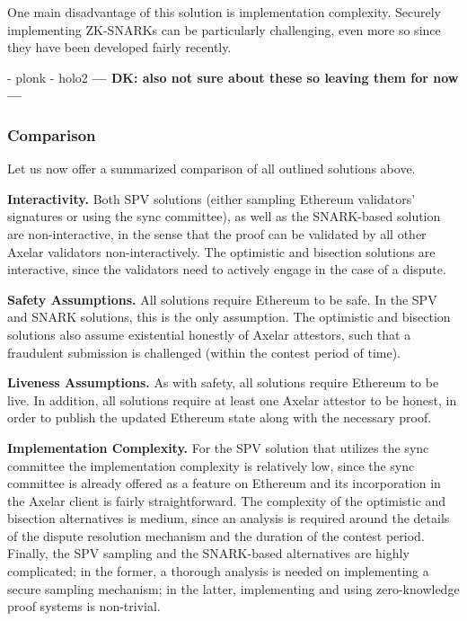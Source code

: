 One main disadvantage of this solution is implementation complexity. Securely
implementing ZK-SNARKs can be particularly challenging, even more so since they
have been developed fairly recently.

- plonk
- holo2
\textbf{--- DK: also not sure about these so leaving them for now ---}

\subsubsection{Comparison}

Let us now offer a summarized comparison of all outlined solutions above.

\noindent\textbf{Interactivity.}
Both SPV solutions (either sampling Ethereum validators' signatures or using
the sync committee), as well as the SNARK-based solution are non-interactive,
in the sense that the proof can be validated by all other Axelar validators
non-interactively. The optimistic and bisection solutions are interactive,
since the validators need to actively engage in the case of a dispute.

\noindent\textbf{Safety Assumptions.}
All solutions require Ethereum to be safe. In the SPV and SNARK solutions, this
is the only assumption. The optimistic and bisection solutions also assume
existential honestly of Axelar attestors, such that a fraudulent submission is
challenged (within the contest period of time).

\noindent\textbf{Liveness Assumptions.}
As with safety, all solutions require Ethereum to be live. In addition, all
solutions require at least one Axelar attestor to be honest, in order to
publish the updated Ethereum state along with the necessary proof.

\noindent\textbf{Implementation Complexity.}
For the SPV solution that utilizes the sync committee the implementation
complexity is relatively low, since the sync committee is already offered as a
feature on Ethereum and its incorporation in the Axelar client is fairly
straightforward. The complexity of the optimistic and bisection alternatives is
medium, since an analysis is required around the details of the dispute
resolution mechanism and the duration of the contest period. Finally, the SPV
sampling and the SNARK-based alternatives are highly complicated; in the
former, a thorough analysis is needed on implementing a secure sampling
mechanism; in the latter, implementing and using zero-knowledge proof systems
is non-trivial.


